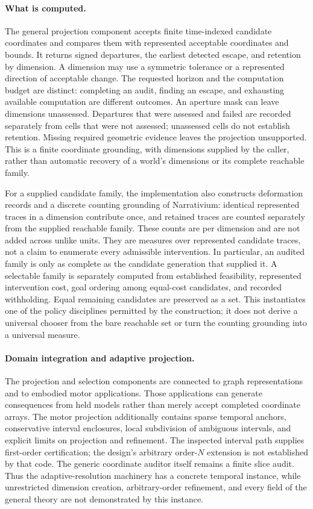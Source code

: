 \documentclass[11pt,a4paper]{article}
\theoremstyle{remark}
\begin{document}
\paragraph{What is computed.}
The general projection component accepts finite time-indexed candidate coordinates
and compares them with represented acceptable coordinates and bounds. It returns
signed departures, the earliest detected escape, and retention by dimension. A
dimension may use a symmetric tolerance or a represented direction of acceptable
change. The requested horizon and the computation budget are distinct: completing
an audit, finding an escape, and exhausting available computation are different
outcomes. An aperture mask can leave dimensions unassessed. Departures that were
assessed and failed are recorded separately from cells that were not assessed;
unassessed cells do not establish retention. Missing required geometric evidence
leaves the projection unsupported. This is a finite coordinate grounding, with
dimensions supplied by the caller, rather than automatic recovery of a world's
dimensions or its complete reachable family.

For a supplied candidate family, the implementation also constructs deformation
records and a discrete counting grounding of Narrativium: identical represented
traces in a dimension contribute once, and retained traces are counted separately
from the supplied reachable family. These counts are per dimension and are not
added across unlike units. They are measures over represented candidate traces,
not a claim to enumerate every admissible intervention. In particular, an audited
family is only as complete as the candidate generation that supplied it. A selectable
family is separately computed from established feasibility, represented intervention
cost, goal ordering among equal-cost candidates, and recorded withholding. Equal
remaining candidates are preserved as a set. This instantiates one of the policy
disciplines permitted by the construction; it does not derive a universal chooser
from the bare reachable set or turn the counting grounding into a universal measure.

\paragraph{Domain integration and adaptive projection.}
The projection and selection components are connected to graph representations and
to embodied motor applications. Those applications can generate consequences from
held models rather than merely accept completed coordinate arrays. The motor
projection additionally contains sparse temporal anchors, conservative interval
enclosures, local subdivision of ambiguous intervals, and explicit limits on
projection and refinement. The inspected interval path supplies first-order
certification; the design's arbitrary order-$N$ extension is not established by that
code. The generic coordinate auditor itself remains a finite slice audit. Thus the
adaptive-resolution machinery has a concrete temporal instance, while unrestricted
dimension creation, arbitrary-order refinement, and every field of the general
theory are not demonstrated by this instance.
\end{document}
